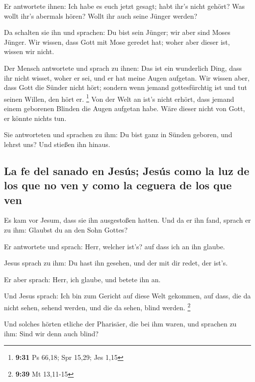  Er antwortete ihnen: Ich habe es euch jetzt gesagt; habt
ihr's nicht gehört? Was wollt ihr's abermals hören? Wollt ihr auch seine
Jünger werden?

 Da schalten sie ihn und sprachen: Du bist sein Jünger;
wir aber sind Moses Jünger.  Wir wissen, dass Gott mit
Mose geredet hat; woher aber dieser ist, wissen wir nicht.

 Der Mensch antwortete und sprach zu ihnen: Das ist ein
wunderlich Ding, dass ihr nicht wisset, woher er sei, und er hat meine
Augen aufgetan.  Wir wissen aber, dass Gott die Sünder
nicht hört; sondern wenn jemand gottesfürchtig ist und tut seinen
Willen, den hört er. \footnote{\textbf{9:31} Ps 66,18; Spr 15,29; Jes
  1,15}  Von der Welt an ist's nicht erhört, dass jemand
einem geborenen Blinden die Augen aufgetan habe.  Wäre
dieser nicht von Gott, er könnte nichts tun.

 Sie antworteten und sprachen zu ihm: Du bist ganz in
Sünden geboren, und lehrst uns? Und stießen ihn hinaus.

\hypertarget{la-fe-del-sanado-en-jesuxfas-jesuxfas-como-la-luz-de-los-que-no-ven-y-como-la-ceguera-de-los-que-ven}{%
\subsection{La fe del sanado en Jesús; Jesús como la luz de los que no
ven y como la ceguera de los que
ven}\label{la-fe-del-sanado-en-jesuxfas-jesuxfas-como-la-luz-de-los-que-no-ven-y-como-la-ceguera-de-los-que-ven}}

 Es kam vor Jesum, dass sie ihn ausgestoßen hatten. Und
da er ihn fand, sprach er zu ihm: Glaubst du an den Sohn Gottes?

 Er antwortete und sprach: Herr, welcher ist's? auf dass
ich an ihn glaube.

 Jesus sprach zu ihm: Du hast ihn gesehen, und der mit
dir redet, der ist's.

 Er aber sprach: Herr, ich glaube, und betete ihn an.

 Und Jesus sprach: Ich bin zum Gericht auf diese Welt
gekommen, auf dass, die da nicht sehen, sehend werden, und die da sehen,
blind werden. \footnote{\textbf{9:39} Mt 13,11-15}

 Und solches hörten etliche der Pharisäer, die bei ihm
waren, und sprachen zu ihm: Sind wir denn auch blind?

